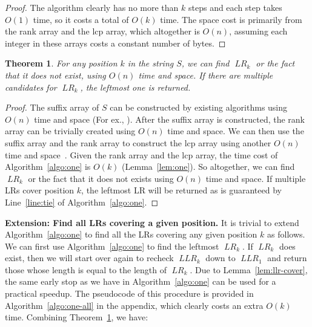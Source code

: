 \documentclass[preprint]{elsarticle}
\newtheorem{theorem}{Theorem}[section]
\DeclareMathOperator{\lr}{\mathit{LR}}
\DeclareMathOperator{\llr}{\mathit{LLR}}
\begin{document}
 \begin{proof}
   The algorithm clearly has no more than $k$ steps and each step
   takes $O(1)$ time, so it costs a total of $O(k)$ time. The space cost is primarily
  from the rank array and the lcp array, which altogether is $O(n)$,
   assuming each integer in these arrays costs a constant number of
   bytes.  

 \end{proof}

\begin{theorem}
\label{thm:one}
For any position $k$ in the string $S$, we can find $\lr_k$ or the
fact that it does not exist, using
$O(n)$ time and  space.  If there are multiple candidates for
$\lr_k$, the leftmost one is returned.
\end{theorem}

\begin{proof}
  The suffix array of $S$ can be constructed by existing algorithms
  using $O(n)$ time and space (For ex., \cite{KA-SA2005}). After the
  suffix array is constructed, the rank array can be trivially created
  using $O(n)$ time and space.  We can then use the suffix array and
  the rank array to construct the lcp array using another $O(n)$ time
  and space~\cite{KLAAP01}.  Given the rank array and the lcp array,
  the time cost of Algorithm~\ref{algo:one} is $O(k)$
  (Lemma~\ref{lem:one}). So altogether, we can find $\lr_k$ or the
  fact that it does not exists using $O(n)$ time and space.
If multiple LRs cover position $k$, the leftmost LR will be returned
  as is guaranteed by Line~\ref{line:tie} of
  Algorithm~\ref{algo:one}. 
\end{proof}



\smallskip 
\noindent
{\bf Extension: Find all LRs covering a given position.} 
It is trivial to extend Algorithm~\ref{algo:one} to find all the LRs
covering any given position $k$ as follows. We can first use
Algorithm~\ref{algo:one} to find the leftmost $\lr_k$. If $\lr_k$ does
exist, then we will start over again to recheck $\llr_k$ down to
$\llr_1$ and return those whose length is equal to the length of
$\lr_k$. Due to Lemma~\ref{lem:llr-cover}, the same early stop as we
have in Algorithm~\ref{algo:one} can be used for a practical
speedup. 
The pseudocode of this
procedure is provided in Algorithm~\ref{algo:one-all} in the appendix, which 
clearly costs an extra $O(k)$ time. Combining
Theorem~\ref{thm:one}, we have:
\end{document}
